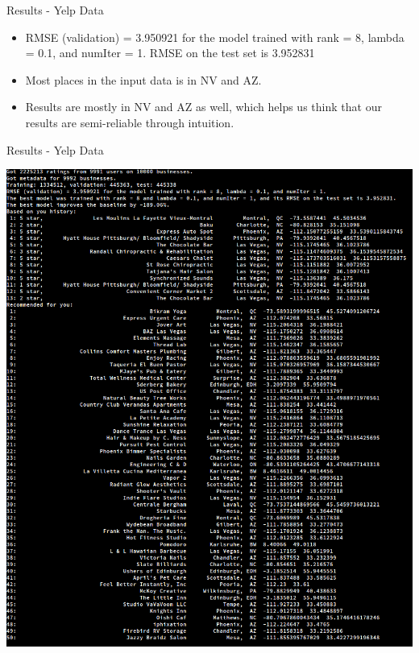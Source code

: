 \documentclass{beamer}
\begin{document}
\begin{frame}{Results - Yelp Data}{}

  \begin{itemize}
      \item {
        RMSE (validation) = 3.950921 for the model trained with rank = 8, lambda = 0.1, and numIter = 1.
        RMSE on the test set is 3.952831
      }
      \item {
        Most places in the input data is in NV and AZ.
      }
      \item {
        Results are mostly in NV and AZ as well, which helps us think that our results are semi-reliable through intuition.
      }
  \end{itemize}
  
\end{frame}


\begin{frame}{Results - Yelp Data}{}

    \includegraphics[width=.98\textwidth, clip=true, trim = 0cm 17cm 4cm 1cm]{image/yelp_results}
  
\end{frame}
\end{document}
